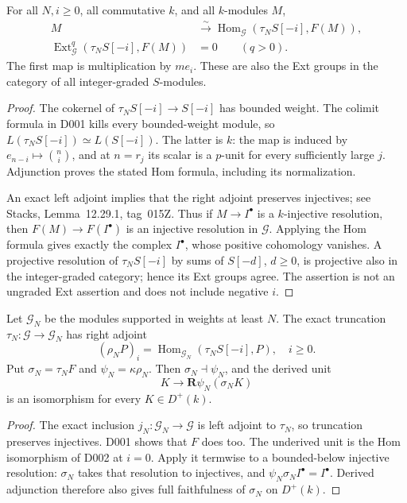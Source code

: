 \begin{theorem}
\label{sa08:D002}
For all $N,i\geq0$, all commutative $k$, and all $k$-modules $M$,
\begin{align*}
 M&\xrightarrow{\ \sim\ }
 \operatorname{Hom}_{\mathcal G}(\tau_NS[-i],F(M)),\\
 \operatorname{Ext}^q_{\mathcal G}(\tau_NS[-i],F(M))&=0
 \qquad(q>0).
\end{align*}
The first map is multiplication by $me_i$. These are also the Ext
groups in the category of all integer-graded $S$-modules.
\end{theorem}
\begin{proof}
The cokernel of $\tau_NS[-i]\to S[-i]$ has bounded weight.
The colimit formula in D001 kills every bounded-weight module, so
$L(\tau_NS[-i])\simeq L(S[-i])$. The latter is $k$: the map is
induced by $e_{n-i}\mapsto\binom ni$, and at $n=r_j$ its scalar is
a $p$-unit for every sufficiently large $j$. Adjunction proves the
stated Hom formula, including its normalization.

An exact left adjoint implies that the right adjoint preserves
injectives; see Stacks, Lemma~12.29.1, tag~015Z. Thus if
$M\to I^\bullet$ is a $k$-injective resolution, then
$F(M)\to F(I^\bullet)$ is an injective resolution in $\mathcal G$.
Applying the Hom formula gives exactly the complex $I^\bullet$,
whose positive cohomology vanishes. A projective resolution of
$\tau_NS[-i]$ by sums of $S[-d]$, $d\geq0$, is projective also in
the integer-graded category; hence its Ext groups agree. The assertion
is not an ungraded Ext assertion and does not include negative $i$.
\end{proof}

\begin{theorem}
\label{sa08:D003}
Let $\mathcal G_N$ be the modules supported in weights at least $N$.
The exact truncation $\tau_N:\mathcal G\to\mathcal G_N$ has right
adjoint
\[
 (\rho_NP)_i
 =\operatorname{Hom}_{\mathcal G_N}(\tau_NS[-i],P),\quad i\geq0.
\]
Put $\sigma_N=\tau_NF$ and $\psi_N=\kappa\rho_N$. Then
$\sigma_N\dashv\psi_N$, and the derived unit
\[
 K\longrightarrow\mathbf R\psi_N(\sigma_NK)
\]
is an isomorphism for every $K\in D^+(k)$.
\end{theorem}
\begin{proof}
The exact inclusion $j_N:\mathcal G_N\to\mathcal G$ is left
adjoint to $\tau_N$, so truncation preserves injectives. D001 shows
that $F$ does too. The underived unit is the Hom isomorphism of
D002 at $i=0$. Apply it termwise to a bounded-below injective
resolution: $\sigma_N$ takes that resolution to injectives, and
$\psi_N\sigma_NI^\bullet=I^\bullet$. Derived adjunction therefore
also gives full faithfulness of $\sigma_N$ on $D^+(k)$.
\end{proof}

